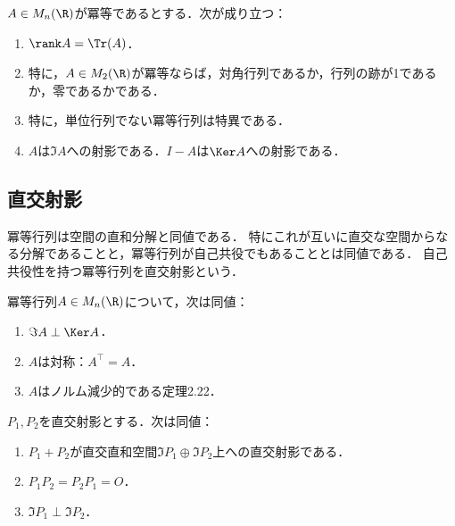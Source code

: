 \documentclass[uplatex, dvipdfmx]{jsreport}
\begin{document}
\begin{corollary}
    $A\in M_n(\R)$が冪等であるとする．次が成り立つ：
    \begin{enumerate}
        \item $\rank A=\Tr(A)$．
        \item 特に，$A\in M_2(\R)$が冪等ならば，対角行列であるか，行列の跡が1であるか，零であるかである．
        \item 特に，単位行列でない冪等行列は特異である．
        \item $A$は$\Im A$への射影である．$I-A$は$\Ker A$への射影である．
    \end{enumerate}
\end{corollary}

\subsection{直交射影}

\begin{tcolorbox}[colframe=ForestGreen, colback=ForestGreen!10!white,breakable,colbacktitle=ForestGreen!40!white,coltitle=black,fonttitle=\bfseries\sffamily,
title=] 
    冪等行列は空間の直和分解と同値である．
    特にこれが互いに直交な空間からなる分解であることと，冪等行列が自己共役でもあることとは同値である．
    自己共役性を持つ冪等行列を直交射影という．
\end{tcolorbox}

\begin{proposition}[直交する射影の特徴付け]
    冪等行列$A\in M_n(\R)$について，次は同値：
    \begin{enumerate}
        \item $\Im A\perp \Ker A$．
        \item $A$は対称：$A^\top =A$．
        \item $A$はノルム減少的である\cite{柳井-竹内-一般逆行列}定理2.22．
    \end{enumerate}
\end{proposition}

\begin{theorem}
    $P_1,P_2$を直交射影とする．次は同値：
    \begin{enumerate}
        \item $P_1+P_2$が直交直和空間$\Im P_1\oplus\Im P_2$上への直交射影である．
        \item $P_1P_2=P_2P_1=O$．
        \item $\Im P_1\perp\Im P_2$．
    \end{enumerate}
\end{theorem}
\end{document}
